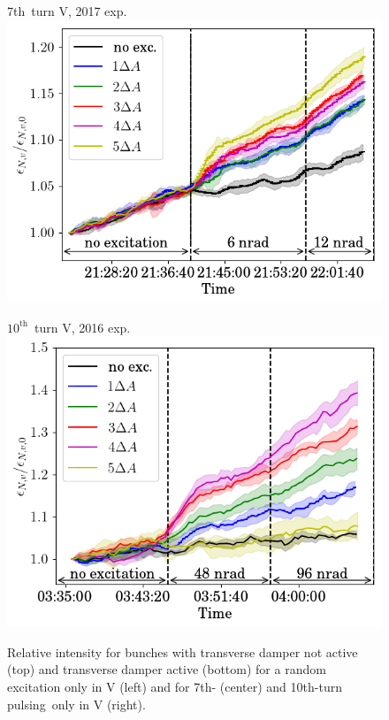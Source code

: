 \documentclass[%
 reprint,
 amsmath,amssymb,
 aps,
prstab,
longbibliography
]{revtex4-1}
\newcommand{\tenthtp}{10th-turn pulsing}
\begin{document}
\begin{figure}
	\begin{minipage}[t]{0.32\linewidth}
		\centering
		7th~turn V, 2017 exp.\\
		\includegraphics[height=0.75\linewidth]{2017_emitv_avg_rel_v7th_with_damper_no_text.png}
	\end{minipage}	
	\begin{minipage}[t]{0.32\linewidth}
		\centering
		$10^{\mathrm{th}}$~turn V, 2016 exp.\\
		\includegraphics[height=0.75\linewidth]{2016_emitv_avg_rel_v10th_with_damper_no_text.png}
	\end{minipage}	
	\caption{\label{fig:damp} Relative intensity for bunches with transverse damper not active (top) and transverse damper active (bottom) for a random excitation only in V (left) and for 7th- (center) and \tenthtp\ only in V (right).}
      \end{figure}
      
\end{document}
